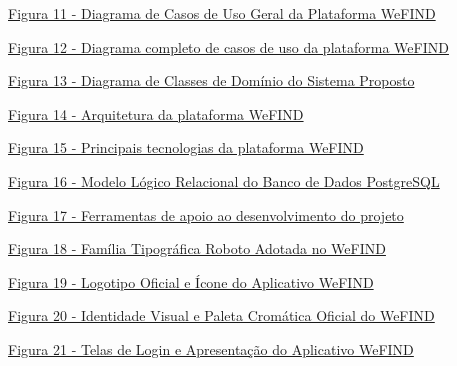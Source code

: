 \noindent \hyperref[fig:diagrama_casos_de_uso]{Figura 11 - Diagrama de Casos de Uso Geral da Plataforma WeFIND \dotfill \pageref{fig:diagrama_casos_de_uso}}\par\vspace{0.12cm}
\noindent \hyperref[fig:diagrama_casos_de_uso_completo]{Figura 12 - Diagrama completo de casos de uso da plataforma WeFIND \dotfill \pageref{fig:diagrama_casos_de_uso_completo}}\par\vspace{0.12cm}
\noindent \hyperref[fig:diagrama_classes]{Figura 13 - Diagrama de Classes de Domínio do Sistema Proposto \dotfill \pageref{fig:diagrama_classes}}\par\vspace{0.12cm}
\noindent \hyperref[fig:arquitetura_wefind]{Figura 14 - Arquitetura da plataforma WeFIND \dotfill \pageref{fig:arquitetura_wefind}}\par\vspace{0.12cm}
\noindent \hyperref[fig:principais_tecnologias]{Figura 15 - Principais tecnologias da plataforma WeFIND \dotfill \pageref{fig:principais_tecnologias}}\par\vspace{0.12cm}
\noindent \hyperref[fig:modelo_logico_banco]{Figura 16 - Modelo Lógico Relacional do Banco de Dados PostgreSQL \dotfill \pageref{fig:modelo_logico_banco}}\par\vspace{0.12cm}
\noindent \hyperref[fig:ferramentas_auxiliares]{Figura 17 - Ferramentas de apoio ao desenvolvimento do projeto \dotfill \pageref{fig:ferramentas_auxiliares}}\par\vspace{0.12cm}
\noindent \hyperref[fig:tipografia]{Figura 18 - Família Tipográfica Roboto Adotada no WeFIND \dotfill \pageref{fig:tipografia}}\par\vspace{0.12cm}
\noindent \hyperref[fig:logotipo]{Figura 19 - Logotipo Oficial e Ícone do Aplicativo WeFIND \dotfill \pageref{fig:logotipo}}\par\vspace{0.12cm}
\noindent \hyperref[fig:paleta_cores]{Figura 20 - Identidade Visual e Paleta Cromática Oficial do WeFIND \dotfill \pageref{fig:paleta_cores}}\par\vspace{0.12cm}
\noindent \hyperref[fig:telas_autenticacao]{Figura 21 - Telas de Login e Apresentação do Aplicativo WeFIND \dotfill \pageref{fig:telas_autenticacao}}\par\vspace{0.12cm}
